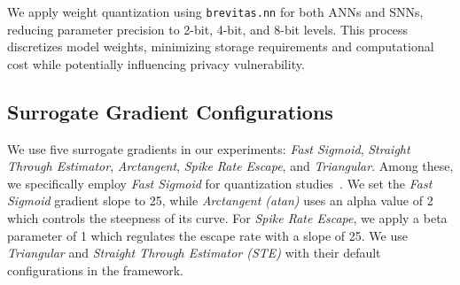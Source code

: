 We apply weight quantization using \texttt{brevitas.nn} for both ANNs and SNNs, reducing parameter precision to 2-bit, 4-bit, and 8-bit levels. This process discretizes model weights, minimizing storage requirements and computational cost while potentially influencing privacy vulnerability.

\subsection{Surrogate Gradient Configurations}

\noindent
We use five surrogate gradients in our experiments: \textit{Fast Sigmoid}, \textit{Straight Through Estimator}, \textit{Arctangent}, \textit{Spike Rate Escape}, and \textit{Triangular}. Among these, we specifically employ \textit{Fast Sigmoid} for quantization studies~\cite{eshraghian2021training}. We set the \textit{Fast Sigmoid} gradient slope to 25, while  \textit{Arctangent (atan)}  uses an alpha value of 2 which controls the steepness of its curve. For \textit{Spike Rate Escape}, we apply a beta parameter of 1 which regulates the escape rate with a slope of 25. We use \textit{Triangular} and \textit{Straight Through Estimator (STE)} with their default configurations in the framework.
\noindent



